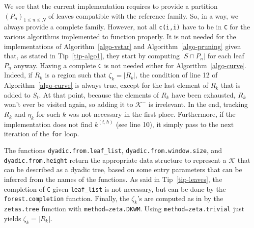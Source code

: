 \documentclass[
  11pt,
  a4paper,
]{article}
\theoremstyle{plain}
\theoremstyle{plain}
\theoremstyle{definition}
\theoremstyle{plain}
\theoremstyle{definition}
\theoremstyle{remark}
\newcounter{quartocallouttipno}
\newcommand{\quartocallouttip}[1]{\refstepcounter{quartocallouttipno}\label{#1}}
\begin{document}
\begin{tcolorbox}[enhanced jigsaw, left=2mm, coltitle=black, toptitle=1mm, colback=white, bottomtitle=1mm, breakable, title=\textcolor{quarto-callout-tip-color}{\faLightbulb}\hspace{0.5em}{Tip \ref*{tip-leaves}: Tip}, titlerule=0mm, arc=.35mm, opacityback=0, opacitybacktitle=0.6, colbacktitle=quarto-callout-tip-color!10!white, toprule=.15mm, bottomrule=.15mm, rightrule=.15mm, colframe=quarto-callout-tip-color-frame, leftrule=.75mm]

\quartocallouttip{tip-leaves} 

We see that the current implementation requires to provide a partition
\((P_n)_{1\leq n \leq N}\) of leaves compatible with the reference
family. So, in a way, we always provide a complete family. However, not
all \texttt{c(i,i)} have to be in \texttt{C} for the various algorithms
implemented to function properly. It is not needed for the
implementations of Algorithm~\ref{algo-vstar} and
Algorithm~\ref{algo-pruning} given that, as stated in
Tip~\ref{tip-algo1}, they start by computing \(|S\cap P_n|\) for each
leaf \(P_n\) anyway. Having a complete \texttt{C} is not needed either
for Algorithm~\ref{algo-curve}. Indeed, if \(R_k\) is a region such that
\(\zeta_k=|R_k|\), the condition of line 12 of
Algorithm~\ref{algo-curve} is always true, except for the last element
of \(R_k\) that is added to \(S_t\). At that point, because the elements
of \(R_k\) have been exhausted, \(R_k\) won't ever be visited again, so
adding it to \(\mathcal{K}^-\) is irrelevant. In the end, tracking
\(R_k\) and \(\eta_k\) for such \(k\) was not necessary in the first
place. Furthermore, if the implementation does not find \(k^{(t,h)}\)
(see line 10), it simply pass to the next iteration of the \texttt{for}
loop.

\end{tcolorbox}

The functions \texttt{dyadic.from.leaf\_list},
\texttt{dyadic.from.window.size}, and \texttt{dyadic.from.height} return
the appropriate data structure to represent a \(\mathcal{K}\) that can
be described as a dyadic tree, based on some entry parameters that can
be inferred from the names of the functions. As said in
Tip~\ref{tip-leaves}, the completion of \texttt{C} given
\texttt{leaf\_list} is not necessary, but can be done by the
\texttt{forest.completion} function. Finally, the \(\zeta_k\)'s are
computed as in \citet{MR4178188} by the \texttt{zetas.tree} function
with \texttt{method=zeta.DKWM}. Using \texttt{method=zeta.trivial} just
yields \(\zeta_k=|R_k|\).
\end{document}
